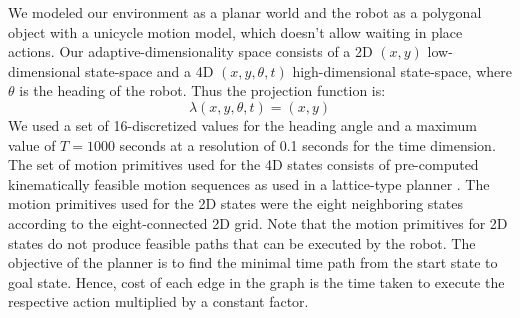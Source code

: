 We modeled our environment as a planar world and the robot as a polygonal object with a unicycle motion model, which doesn't allow waiting in place actions. Our adaptive-dimensionality space consists of a 2D $(x,y)$ low-dimensional state-space and a 4D $(x,y,\theta,t)$ high-dimensional state-space, where $\theta$  is the heading of the robot. Thus the projection function is:
$$ \lambda(x,y,\theta,t) = (x,y)$$
We used a set of 16-discretized values for the heading angle and a maximum value of $T = 1000$ seconds at a resolution of 0.1 seconds for the time dimension. The set of motion primitives used for the 4D states consists of pre-computed kinematically feasible motion sequences as used in a lattice-type planner \cite{likhachev2009planning}. The motion primitives used for the 2D states were the eight neighboring states according to the eight-connected 2D grid. Note that the motion primitives for 2D states do not produce feasible paths that can be executed by the robot. The objective of the planner is to find the minimal time path from the start state to goal state. Hence, cost of each edge in the graph is the time taken to execute the respective action multiplied by a constant factor. 


